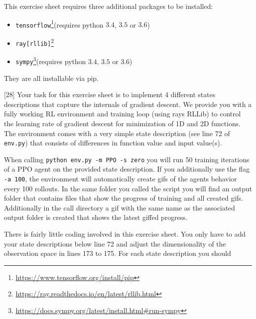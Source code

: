\documentclass{exam}
\begin{document}
	\gccs
	\noindent This exercise sheet requires three additional packages to be installed:
	\begin{itemize}
		\item \texttt{tensorflow}\footnote{\url{https://www.tensorflow.org/install/pip}}\hspace*{2cm}(requires python $3.4$, $3.5$ or $3.6$)
		\item \texttt{ray[rllib]}\footnote{\url{https://ray.readthedocs.io/en/latest/rllib.html}}
		\item \texttt{sympy}\footnote{\url{https://docs.sympy.org/latest/install.html\#run-sympy}}\hspace*{3cm}(requires python $3.4$, $3.5$ or $3.6$)
	\end{itemize}
	They are all installable via pip.\\
	\begin{questions}
		[28]
		Your task for this exercise sheet is to implement 4 different states descriptions that capture the internals of gradient descent.
		We provide you with a fully working RL environment and training loop (using rays RLLib) to control the learning rate of gradient descent for minimization of 1D and 2D functions.
		The environment comes with a very simple state description (see line 72 of \texttt{env.py}) that consists of differences in function value and input value(s).
		
		When calling \texttt{python env.py -m PPO -s zero} you will run 50 training iterations of a PPO agent on the provided state description. If you additionally use the flag \texttt{-a 100},
		the environment will automatically create gifs of the agents behavior every 100 rollouts. In the same folder you called the script you will find an output folder that contains files that
		show the progress of training and all created gifs. Additionally in the call directory a gif with the same name as the associated output folder is created that shows the latest giffed progress.
		
		There is fairly little coding involved in this exercise sheet. You only have to add your state descriptions below line 72 and adjust the dimensionality of the observation space in lines 173 to 175.
		\newpage\noindent
		For each state description you should
\end{questions}
\end{document}
